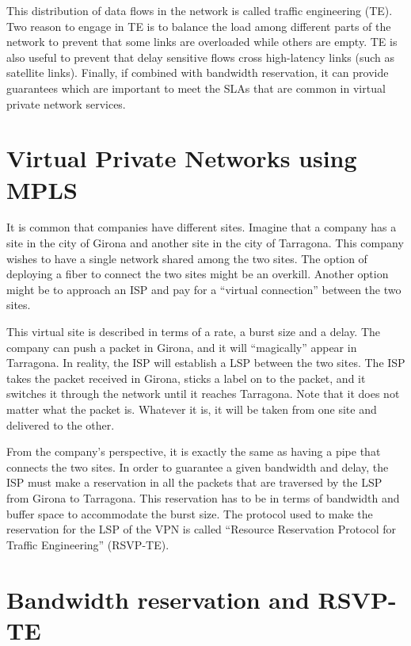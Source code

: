 This distribution of data flows in the network is called traffic engineering (TE).
Two reason to engage in TE is to balance the load among different parts of the network to prevent that some links are overloaded while others are empty.
TE is also useful to prevent that delay sensitive flows cross high-latency links (such as satellite links).
Finally, if combined with bandwidth reservation, it can provide guarantees which are important to meet the SLAs that are common in virtual private network services.

\section{Virtual Private Networks using MPLS}
It is common that companies have different sites.
Imagine that a company has a site in the city of Girona and another site in the city of Tarragona.
This company wishes to have a single network shared among the two sites.
The option of deploying a fiber to connect the two sites might be an overkill.
Another option might be to approach an ISP and pay for a ``virtual connection'' between the two sites.

This virtual site is described in terms of a rate, a burst size and a delay.
The company can push a packet in Girona, and it will ``magically'' appear in Tarragona.
In reality, the ISP will establish a LSP between the two sites.
The ISP takes the packet received in Girona, sticks a label on to the packet, and it switches it through the network until it reaches Tarragona.
Note that it does not matter what the packet is.
Whatever it is, it will be taken from one site and delivered to the other.

From the company's perspective, it is exactly the same as having a pipe that connects the two sites.
In order to guarantee a given bandwidth and delay, the ISP must make a reservation in all the packets that are traversed by the LSP from Girona to Tarragona.
This reservation has to be in terms of bandwidth and buffer space to accommodate the burst size.
The protocol used to make the reservation for the LSP of the VPN is called ``Resource Reservation Protocol for Traffic Engineering'' (RSVP-TE).


\section{Bandwidth reservation and RSVP-TE}



